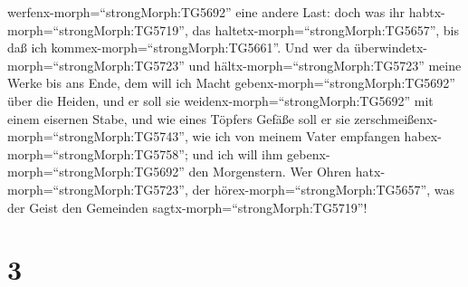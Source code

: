 werfenx-morph=``strongMorph:TG5692'' eine andere Last: 
doch was ihr habtx-morph=``strongMorph:TG5719'', das
haltetx-morph=``strongMorph:TG5657'', bis daß ich
kommex-morph=``strongMorph:TG5661''.  Und wer da
überwindetx-morph=``strongMorph:TG5723'' und
hältx-morph=``strongMorph:TG5723'' meine Werke bis ans Ende, dem will
ich Macht gebenx-morph=``strongMorph:TG5692'' über die Heiden,
 und er soll sie weidenx-morph=``strongMorph:TG5692'' mit
einem eisernen Stabe, und wie eines Töpfers Gefäße soll er sie
zerschmeißenx-morph=``strongMorph:TG5743'',  wie ich von
meinem Vater empfangen habex-morph=``strongMorph:TG5758''; und ich will
ihm gebenx-morph=``strongMorph:TG5692'' den Morgenstern. 
Wer Ohren hatx-morph=``strongMorph:TG5723'', der
hörex-morph=``strongMorph:TG5657'', was der Geist den Gemeinden
sagtx-morph=``strongMorph:TG5719''!

\hypertarget{section-2}{%
\section{3}\label{section-2}}

